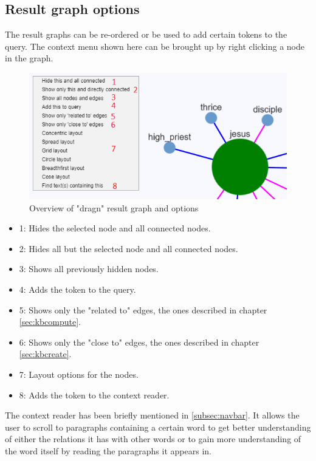\subsection{Result graph options}
The result graphs can be re-ordered or be used to add certain tokens to the query. The context menu shown here can be brought up by right clicking a node in the graph.
\begin{figure}[H]
    \centering
    \hspace*{-1,5cm}
    \includegraphics[scale=0.8]{fig/graph-interface}
    \caption{Overview of "dragn" result graph and options}
    \label{fig:graph-options}
\end{figure}
\begin{itemize}
    \item 1: Hides the selected node and all connected nodes.
    \item 2: Hides all but the selected node and all connected nodes.
    \item 3: Shows all previously hidden nodes.
    \item 4: Adds the token to the query.
    \item 5: Shows only the "related to" edges, the ones described in chapter \ref{sec:kbcompute}.
    \item 6: Shows only the "close to" edges, the ones described in chapter \ref{sec:kbcreate}.
    \item 7: Layout options for the nodes.
    \item 8: Adds the token to the context reader.
\end{itemize}
The context reader has been briefly mentioned in \ref{subsec:navbar}. It allows the user to scroll to paragraphs containing a certain word to get better understanding of either the relations it has with other words or to gain more understanding of the word itself by reading the paragraphs it appears in.


